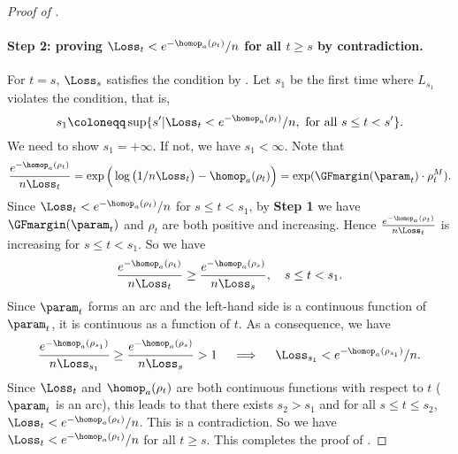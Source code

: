 \begin{proof}[Proof of ]
\paragraph{Step 2: proving $\Loss_t < e^{-\homop_a(\rho_t)}/n$ for all $t\ge s$ by contradiction.} 
For $t=s$, $\Loss_s$ satisfies the condition by .
Let $s_1$ be the first time where $L_{s_1}$ violates the condition,
that is,
\[
    s_1 \coloneqq  \sup \{ s^\prime | \Loss_t < e^{-\homop_a(\rho_t)}/n, \text{ for all } s\le t<s^\prime \}.
\]
We need to show $s_1 = + \infty$.
If not, we have $s_1 < \infty$. 
Note that 
\[
    \frac{e^{-\homop_a(\rho_t)}}{n\Loss_t} = \exp\Big( \log\big(1/n\Loss_t \big)   - \homop_a(\rho_t) \Big)  = \exp(\GFmargin(\param_t)\cdot \rho_t^M). 
\]
Since $\Loss_t < e^{-\homop_a(\rho_t)}/n$ for $s\le t<s_1$, by \textbf{Step 1} we have $\GFmargin(\param_t)$ and $\rho_t$ are both positive and increasing.  
Hence $\frac{e^{-\homop_a(\rho_t)}}{n\Loss_t}$ is increasing for $s\le t<s_1$. 
So we have
\[
    \frac{e^{-\homop_a(\rho_t)}}{n\Loss_t}\ge \frac{e^{-\homop_a(\rho_s)}}{n\Loss_s},\quad s\le t <s_1. 
\]
Since $\param_t$ forms an arc and the left-hand side is a continuous function of $\param_t$, it is continuous as a function of $t$. 
As a consequence, we have
\[
    \frac{e^{-\homop_a(\rho_{s_1})}}{n\Loss_{s_1}} \ge \frac{e^{-\homop_a(\rho_s)}}{n\Loss_s}> 1 \quad \implies \quad \Loss_{s_1} < e^{-\homop_a(\rho_{s_1})} /n. 
\]
Since $\Loss_t$ and $\homop_a(\rho_{t})$ are both continuous functions with respect to $t$ ($\param_t$ is an arc), this leads to that there exists $s_2>s_1$ and for all $s\le t\le s_2$, $\Loss_t < e^{-\homop_a(\rho_t)}/n$. This is a contradiction. So we have $\Loss_t < e^{-\homop_a(\rho_t)}/n$ for all $t\ge s$.  This completes the proof of . 
\end{proof}


